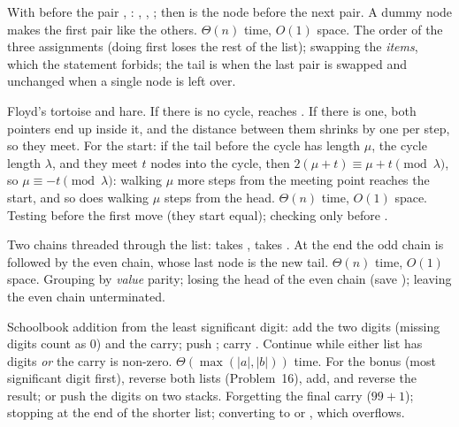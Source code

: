 \idea With  before the pair , : ,
, ; then  is the node before the next pair. A
dummy node makes the first pair like the others.
\complexity $\Theta(n)$ time, $O(1)$ space.
\mistakes The order of the three assignments (doing  first loses the rest
of the list); swapping the \emph{items}, which the statement forbids; the tail is 
when the last pair is swapped and unchanged when a single node is left over.

\idea Floyd's tortoise and hare. If there is no cycle,  reaches . If
there is one, both pointers end up inside it, and the distance between them shrinks by
one per step, so they meet. For the start: if the tail before the cycle has length
$\mu$, the cycle length $\lambda$, and they meet $t$ nodes into the cycle, then
$2(\mu+t)\equiv\mu+t\pmod\lambda$, so $\mu\equiv-t\pmod\lambda$: walking $\mu$ more steps
from the meeting point reaches the start, and so does walking $\mu$ steps from the head.
\complexity $\Theta(n)$ time, $O(1)$ space.
\mistakes Testing  before the first move (they start equal); checking
only  before .

\idea Two chains threaded through the list:  takes , 
takes . At the end the odd chain is followed by the even chain, whose last
node is the new tail.
\complexity $\Theta(n)$ time, $O(1)$ space.
\mistakes Grouping by \emph{value} parity; losing the head of the even chain (save
); leaving the even chain unterminated.

\idea Schoolbook addition from the least significant digit: add the two digits (missing
digits count as 0) and the carry; push ; carry . Continue
while either list has digits \emph{or} the carry is non-zero.
\complexity $\Theta(\max(|a|,|b|))$ time. For the bonus (most significant digit first),
reverse both lists (Problem~16), add, and reverse the result; or push the digits on two
stacks.
\mistakes Forgetting the final carry ($99+1$); stopping at the end of the shorter list;
converting to  or , which overflows.
